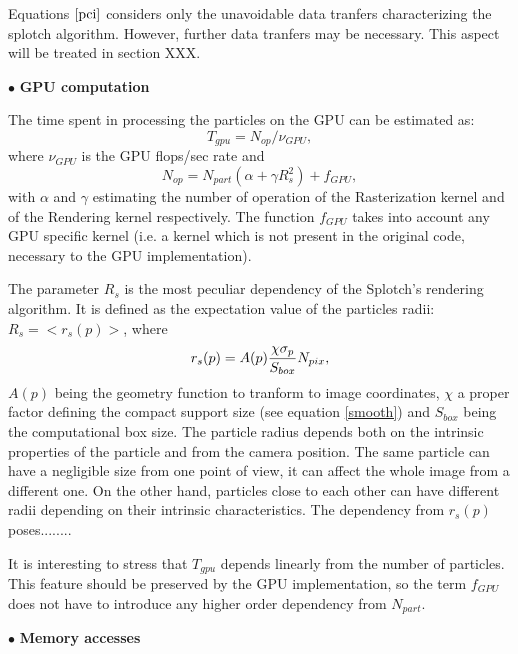 \documentclass[11pt]{article}
\begin{document}
Equations $\eqref{pci}$ considers only the unavoidable data tranfers characterizing
the splotch algorithm. However, further data tranfers may be necessary.
This aspect will be treated in section XXX.

\noindent$\bullet$ {\bf GPU computation}

The time spent in processing the particles on the GPU can be estimated as:
\begin{equation}
T_{gpu} = N_{op}/\nu_{GPU},
\end{equation}
where $\nu_{GPU}$ is the GPU flops/sec rate and
\begin{equation}\label{ops}
N_{op} = N_{part}(\alpha + \gamma R_s^2) + f_{GPU},
\end{equation}
with $\alpha$ and $\gamma$ estimating the number of operation of 
the Rasterization kernel  
and of the Rendering kernel respectively. The function 
$f_{GPU}$ takes into account any GPU specific kernel (i.e. a kernel
which is not present in the original code, necessary to the GPU implementation). 

The parameter $R_s$ is the most peculiar dependency of the Splotch's rendering
algorithm. It is defined as the expectation value of the particles radii:
$R_s = <r_s(p)>$, where
\begin{equation}
r_s(p) = A(p){\chi \sigma_p\over S_{box}} N_{pix},
\end{equation} 
$A(p)$ being the geometry function to tranform to image coordinates,
$\chi$ a proper factor defining the compact support size (see  
equation \eqref{smooth}) and $S_{box}$ being the computational box size.
The particle radius depends both on the intrinsic properties of the particle
and from the camera position. The same particle can have a negligible size
from one point of view, it can affect the whole image from a different one.
On the other hand, particles close to each other can have different radii depending
on their intrinsic characteristics. The dependency from $r_s(p)$ poses........ 

It is interesting to stress that $T_{gpu}$ depends linearly from the number of particles. 
This feature should be preserved by the GPU implementation, so the term 
$f_{GPU}$ does not have to introduce any higher order dependency from $N_{part}$. 

\noindent$\bullet$ {\bf Memory accesses}
\end{document}
